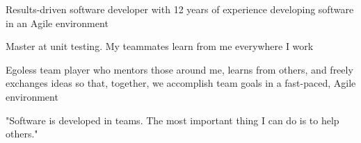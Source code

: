 %
    \begin{itemize*}
        \item Results-driven software developer with 12 years of experience developing software in an Agile environment
        \item Master at unit testing. My teammates learn from me everywhere I work
        \item Egoless team player who mentors those around me, learns from others, and freely exchanges ideas so that,
            together, we accomplish team goals in a fast-paced, Agile environment
        \item "Software is developed in teams.  The most important thing I can do is to help others."
    \end{itemize*}
